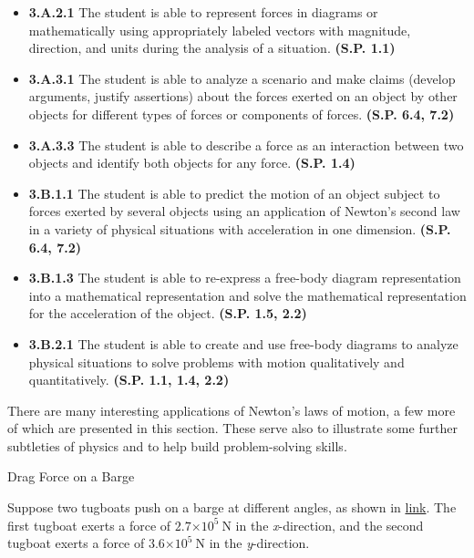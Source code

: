 \documentclass[
]{book}
\providecommand{\tightlist}{%
  \setlength{\itemsep}{0pt}\setlength{\parskip}{0pt}}
\begin{document}
\begin{itemize}
\tightlist
\item
  \textbf{3.A.2.1} The student is able to represent forces in diagrams or
  mathematically using appropriately labeled vectors with magnitude,
  direction, and units during the analysis of a situation. \textbf{(S.P.
  1.1)}
\item
  \textbf{3.A.3.1} The student is able to analyze a scenario and make
  claims (develop arguments, justify assertions) about the forces
  exerted on an object by other objects for different types of forces
  or components of forces. \textbf{(S.P. 6.4, 7.2)}
\item
  \textbf{3.A.3.3} The student is able to describe a force as an
  interaction between two objects and identify both objects for any
  force. \textbf{(S.P. 1.4)}
\item
  \textbf{3.B.1.1} The student is able to predict the motion of an object
  subject to forces exerted by several objects using an application of
  Newton's second law in a variety of physical situations with
  acceleration in one dimension. \textbf{(S.P. 6.4, 7.2)}
\item
  \textbf{3.B.1.3} The student is able to re-express a free-body diagram
  representation into a mathematical representation and solve the
  mathematical representation for the acceleration of the object.
  \textbf{(S.P. 1.5, 2.2)}
\item
  \textbf{3.B.2.1} The student is able to create and use free-body diagrams
  to analyze physical situations to solve problems with motion
  qualitatively and quantitatively. \textbf{(S.P. 1.1, 1.4, 2.2)}
\end{itemize}

There are many interesting applications of Newton's laws of motion, a
few more of which are presented in this section. These serve also to
illustrate some further subtleties of physics and to help build
problem-solving skills.

\hypertarget{fs-id2383966}{}
Drag Force on a Barge

Suppose two tugboats push on a barge at different angles, as shown in
\protect\hyperlink{import-auto-id1221020}{link}. The first
tugboat exerts a force of \({2.7{\times \text{10}^{5}}\ \text{N}}{}\) in
the \emph{x}-direction, and the second tugboat exerts a force of
\({3.6{\times \text{10}^{5}}\ \text{N}}{}\) in the \emph{y}-direction.
\end{document}
